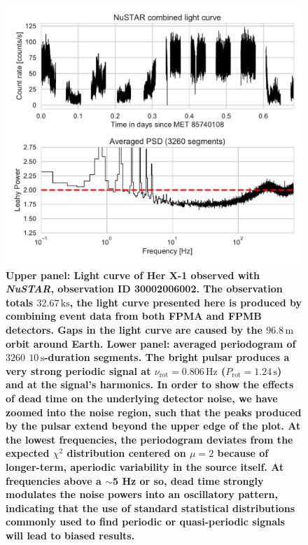 \documentclass[12pt]{emulateapj}
\newcommand{\project}[1]{\textsl{#1}}
\newcommand{\nustar}{\project{NuSTAR}\xspace}
\begin{document}
\begin{figure}
\begin{center}
\includegraphics[width=\textwidth]{nustar_lc_psd.pdf}
\caption{\textbf{Upper panel: Light curve of Her X-1 observed with \nustar, observation ID 30002006002. The observation totals $32.67\,\mathrm{ks}$, the light curve presented here is produced by combining event data from both FPMA and FPMB detectors. Gaps in the light curve are caused by the $96.8 \,\mathrm{m}$ orbit around Earth. Lower panel: averaged periodogram of $3260$ $10\,\mathrm{s}$-duration segments. The bright pulsar produces a very strong periodic signal at $\nu_\mathrm{rot} = 0.806\,\mathrm{Hz}$ ($P_\mathrm{rot} = 1.24\,\mathrm{s}$) and at the signal's harmonics. In order to show the effects of dead time on the underlying detector noise, we have zoomed into the noise region, such that the peaks produced by the pulsar extend beyond the upper edge of the plot. At the lowest frequencies, the periodogram deviates from the expected $\chi^2$ distribution centered on $\mu = 2$ because of longer-term, aperiodic variability in the source itself. At frequencies above a $\sim$5 Hz or so, dead time strongly modulates the noise powers into an oscillatory pattern, indicating that the use of standard statistical distributions commonly used to find periodic or quasi-periodic signals will lead to biased results.
}}
\label{fig:herx1_lc}
\end{center}
\end{figure}
\end{document}
